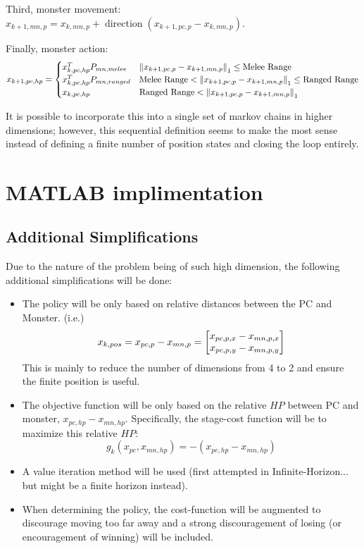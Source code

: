 \documentclass[9pt, onecolumn]{report}
\begin{document}
Third, monster movement: $x_{k+1,mn,p} = x_{k,mn,p} + \operatorname{direction}(x_{k+1,pc,p} - x_{k,mn,p})$.

Finally, monster action:\[
    x_{k+1,pc,hp} = \begin{cases}
        x_{k,pc,hp}^T P_{mn,melee}  & \norm{x_{k+1,pc,p} - x_{k+1,mn,p}}_1 \leq \text{Melee Range}\\
        x_{k,pc,hp}^T P_{mn,ranged} & \text{Melee Range} < \norm{x_{k+1,pc,p} - x_{k+1,mn,p}}_1 \leq \text{Ranged Range}\\
        x_{k,pc,hp} & \text{Ranged Range} < \norm{x_{k+1,pc,p} - x_{k+1,mn,p}}_1
    \end{cases}
\]

It is possible to incorporate this into a single set of markov chains in higher dimensions; however, this sequential definition seems to make the most sense instead of defining a finite number of position states and closing the loop entirely.

\newpage
\section{MATLAB implimentation}
\subsection{Additional Simplifications}
Due to the nature of the problem being of such high dimension, the following additional simplifications will be done:
\begin{itemize}
    \item The policy will be only based on relative distances between the PC and Monster. (i.e.) \[
        x_{k,pos} = x_{pc,p} - x_{mn,p} = \mqty[x_{pc,p,x} - x_{mn,p,x}\\ x_{pc,p,y} - x_{mn,p,y}]
    \]
    This is mainly to reduce the number of dimensions from 4 to 2 and ensure the finite position is useful.
    \item The objective function will be only based on the relative $HP$ between PC and monster, $x_{pc,hp} - x_{mn,hp}$.
    Specifically, the stage-cost function will be to maximize this relative $HP$: \[
        g_k(x_{pc},x_{mn,hp}) = -(x_{pc,hp} - x_{mn,hp})
    \]
    \item A value iteration method will be used (first attempted in Infinite-Horizon... but might be a finite horizon instead).
    \item When determining the policy, the cost-function will be augmented to discourage moving too far away and a strong discouragement of losing (or encouragement of winning) will be included.
\end{itemize}
\end{document}

